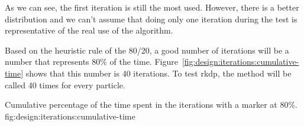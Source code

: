 As we can see, the first iteration is still the most used.
However, there is a better distribution and we can't assume that doing only one
iteration during the test is representative of the real use of the algorithm.

Based on the heuristic rule of the 80/20, a good number of iterations
will be a number that represents 80\% of the time.
Figure~\ref{fig:design:iterations:cumulative-time} shows that this number
is 40 iterations.
To test \acrshort{rkdp}, the method will be called 40 times for every particle.

        {Cumulative percentage of the time spent in the iterations with a marker
        at 80\%.}
        {fig:design:iterations:cumulative-time}